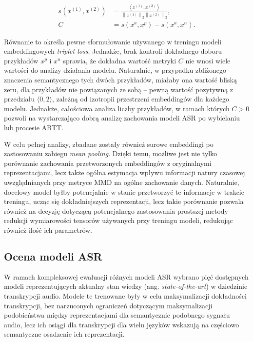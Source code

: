 \begin{equation}
\label{eq:whitenSemanticEval}
\begin{aligned}
s(x^{(1)}, x^{(2)})
&=
\frac{\left\langle x^{(1)}, x^{(2)} \right\rangle}
     {\left\|x^{(1)}\right\|_2 \left\|x^{(2)}\right\|_2}, \\
C
&=
s(x^a, x^p) - s(x^a, x^n).
\end{aligned}
\end{equation}

Równanie to określa pewne sformułowanie używanego w treningu modeli embeddingowych \textit{triplet loss}. Jednakże, brak kontroli dokładnego doboru przykładów $x^p$ i $x^n$ sprawia, że dokładna wartość metryki $C$ nie wnosi wiele wartości do analizy działania modelu. Naturalnie, w przypadku zbliżonego znaczenia semantycznego tych dwóch przykładów, miałaby ona wartość bliską zeru, dla przykładów nie powiązanych ze sobą -- pewną wartość pozytywną z przedziału $\langle 0, 2 \rangle$, zależną od izotropii przestrzeni embeddingów dla każdego modelu. Jednakże, całościowa analiza liczby przykładów, w ramach których $C > 0$ pozwoli na wystarczająco dobrą analizę zachowania modeli ASR po wybielaniu lub procesie ABTT.

W celu pełnej analizy, zbadane zostały również surowe embeddingi po zastosowaniu zabiegu \textit{mean pooling}. Dzięki temu, możliwe jest nie tylko porównanie zachowania przetworzonych embeddingów z oryginalnymi reprezentacjami, lecz także ogólna estymacja wpływu informacji natury czasowej uwzględnianych przy metryce MMD na ogólne zachowanie danych. Naturalnie, docelowy model byłby potencjalnie w stanie przetworzyć te informacje w trakcie treningu, ucząc się dokładniejszych reprezentacji, lecz takie porównanie pozwala również na decyzję dotyczącą potencjalnego zastosowania prostszej metody redukcji wymiarowości tensorów używanych przy treningu modeli, redukując również ilość ich parametrów.


\subsection{Ocena modeli ASR}
W ramach kompleksowej ewaluacji różnych modeli ASR wybrano pięć dostępnych modeli reprezentujących aktualny stan wiedzy (ang. \textit{state-of-the-art}) w dziedzinie transkrypcji audio. Modele te trenowane były w celu maksymalizacji dokładności transkrypcji, bez narzuconych ograniczeń dotyczącym maksymalizacji podobieństwa między reprezentacjami dla semantycznie podobnego sygnału audio, lecz ich osiągi dla transkrypcji dla wielu języków wskazują na częściowo semantyczne osadzenie ich reprezentacji.

